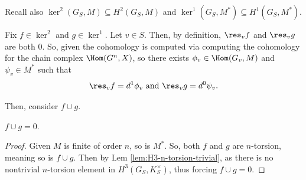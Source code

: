 \documentclass[11pt]{article}
\begin{document}
\bigskip
Recall also $\ker^2 (G_S, M) \subseteq H^2 (G_S, M)$ and $\ker^1 (G_S, M^*) \subseteq H^1 (G_S, M^*)$.

\bigskip
Fix $f \in \ker^2$ and $g \in \ker^1$. Let $v \in S$. Then, by definition, $\res_v f$ and $\res_v g$ are both 0. So, given the cohomology is computed via computing the cohomology for the chain complex $\Hom (G^n, X)$, so there exists $\phi_v \in \Hom (G_v, M)$  and $\psi_v \in M^*$ such that
\[
\res_v f = d^1 \phi_v \text{ and } \res_v g = d^0 \psi_v.
\]

\bigskip
Then, consider $f \cup g$.
\begin{claim}
    $f \cup g = 0$.
\end{claim}

\begin{proof}
Given $M$ is finite of order $n$, so is $M^*$. So, both $f$ and $g$ are $n$-torsion, meaning so is $f \cup g$. Then by Lem \ref{lem:H3-n-torsion-trivial}, as there is no nontrivial $n$-torsion element in $H^3 (G_S, K_S^\times)$, thus forcing $f \cup g = 0$.
\end{proof}
\end{document}
